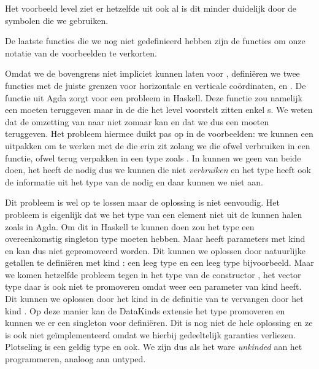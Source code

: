 
Het voorbeeld level ziet er hetzelfde uit ook al is dit minder duidelijk door
de symbolen die we gebruiken.


De laatste functies die we nog niet gedefinieerd hebben zijn de functies om
onze notatie van de voorbeelden te verkorten.


Omdat we de bovengrens niet impliciet kunnen laten voor ,
definiëren we twee functies met de juiste grenzen voor horizontale en verticale
coördinaten,  en . De  functie uit Agda zorgt voor
een probleem in Haskell. Deze functie zou namelijk een 
moeten teruggeven maar in de  die het level voorstelt zitten
enkel s. We weten dat de omzetting van  naar
 niet zomaar kan en dat we dus een  moeten
teruggeven. Het probleem hiermee duikt pas op in de voorbeelden: we kunnen een
 uitpakken om te werken met de  die erin
zit zolang we die  ofwel verbruiken in een functie, ofwel
terug verpakken in een type zoals . In  kunnen we
geen van beide doen, het  heeft de  nodig dus we
kunnen die niet \emph{verbruiken} en het type  heeft ook de
informatie uit het type van de  nodig en daar kunnen we niet
aan.

Dit probleem is wel op te lossen maar de oplossing is niet eenvoudig. Het
probleem is eigenlijk dat we het type van een element niet uit de
 kunnen halen zoals in Agda. Om dit in Haskell te kunnen doen zou
het type  een overeenkomstig singleton type moeten hebben. Maar
 heeft parameters met kind  en kan dus niet
gepromoveerd worden. Dit kunnen we oplossen door natuurlijke getallen te
definiëren met kind \ihask{*}: een leeg type  en een leeg type
 bijvoorbeeld. Maar we komen hetzelfde probleem tegen in het type
van de constructor , het vector type daar is ook niet te promoveren
omdat  weer een parameter van kind  heeft. Dit kunnen we
oplossen door het kind  in de definitie van  te vervangen
door het kind \ihask{*}. Op deze manier kan de DataKinds extensie het
 type promoveren en kunnen we er een singleton voor definiëren.
Dit is nog niet de hele oplossing en ze is ook niet geïmplementeerd omdat we
hierbij gedeeltelijk garanties verliezen. Plotseling is  een
geldig type en  ook. We zijn dus als het ware \emph{unkinded}
aan het programmeren, analoog aan untyped.

